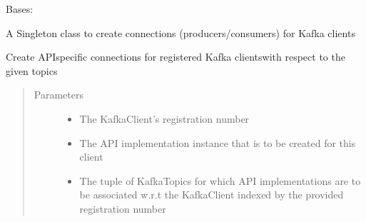 \documentclass[letterpaper,10pt,english]{sphinxmanual}
\begin{document}

\begin{fulllineitems}
\label{\detokenize{Forge:Forge.KafkaConnectionFactory}}
\sphinxAtStartPar
Bases: 

\sphinxAtStartPar
A Singleton class to create connections (producers/consumers) for Kafka clients

\begin{fulllineitems}
\label{\detokenize{Forge:Forge.KafkaConnectionFactory.create_connection}}
\sphinxAtStartPar
Create API\sphinxhyphen{}specific connections for registered Kafka clients\textendash{}with respect to the given topics
\begin{quote}\begin{description}
\item[{Parameters}] \leavevmode\begin{itemize}
\item {} 
\sphinxAtStartPar
{} \textendash{} The KafkaClient’s registration number

\item {} 
\sphinxAtStartPar
{} \textendash{} The API implementation instance that is to be created for this client

\item {} 
\sphinxAtStartPar
{} \textendash{} The tuple of KafkaTopics for which API implementations are to be associated w.r.t the KafkaClient
indexed by the provided registration number

\end{itemize}


\end{description}
\end{quote}
\end{fulllineitems}
\end{fulllineitems}
\end{document}
